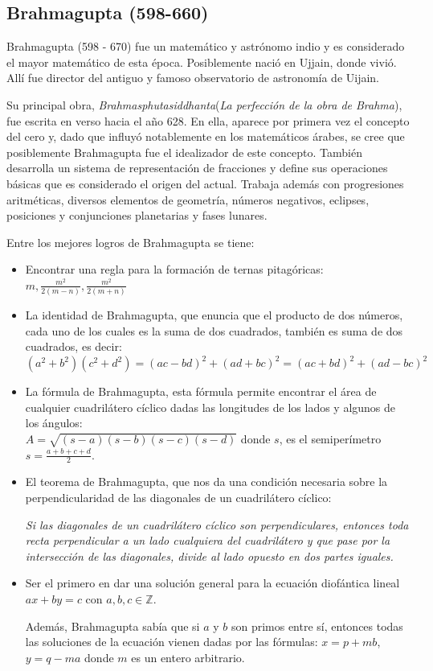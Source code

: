 \documentclass[a4paper, 11pt]{article}
\begin{document}
	\subsection{Brahmagupta (598-660)}
		Brahmagupta (598 - 670) fue un matemático y astrónomo indio y es considerado el mayor matemático de esta época.
		Posiblemente nació en Ujjain, donde vivió. Allí fue director del antiguo y famoso observatorio de astronomía de
		Uijain.
		
		Su principal obra, \textit{Brahmasphutasiddhanta}(\textit{La perfección de la obra de Brahma}), fue escrita en
		verso hacia el año 628. En ella, aparece por primera vez el concepto del cero y, dado que influyó notablemente
		en los matemáticos árabes, se cree que posiblemente Brahmagupta fue el idealizador de este concepto. También
		desarrolla un sistema de representación de fracciones y define sus operaciones básicas que es considerado el
		origen del actual. Trabaja además con progresiones aritméticas, diversos elementos de geometría, números
		negativos, eclipses, posiciones y conjunciones planetarias y fases lunares.

		Entre los mejores logros de Brahmagupta se tiene:
		\begin{itemize}
			\item Encontrar una regla para la formación de ternas pitagóricas: \\
			$\displaystyle m, {\frac{m^{2}}{2(m-n)}}, {\frac{m^{2}}{2(m+n)}}$
			\item La identidad de Brahmagupta, que enuncia que el producto de dos números, cada uno de los cuales es la
			suma de dos cuadrados, también es suma de dos cuadrados, es decir: \\
			$\displaystyle (a^2 + b^2)(c^2 + d^2) =(ac - bd)^2 + (ad + bc)^2 = (ac + bd)^2 + (ad-bc)^2$
			\item La fórmula de Brahmagupta, esta fórmula permite encontrar el área de cualquier cuadrilátero cíclico
			dadas las longitudes de los lados y algunos de los ángulos: \\
			$\displaystyle A = \sqrt{(s - a)(s - b)(s - c)(s - d)}$ donde $s$, es el semiperímetro $\displaystyle s =
			\frac {a + b + c + d}{2}$. 
			\item El teorema de Brahmagupta, que nos da una condición necesaria sobre la perpendicularidad de las
			diagonales de un cuadrilátero cíclico:
			\begin{center}
				\em Si las diagonales de un cuadrilátero cíclico son perpendiculares, entonces toda recta perpendicular
				a un lado cualquiera del cuadrilátero y que pase por la intersección de las diagonales, divide al lado
				opuesto en dos partes iguales.
			\end{center}
			\item Ser el primero en dar una solución general para la ecuación diofántica lineal $ax + by = c$ con $a,b,c
			\in \mathbb {Z}$.
			
			Además, Brahmagupta sabía que si $a$ y $b$ son primos entre sí, entonces todas las soluciones de la ecuación
			vienen dadas por las fórmulas: $x = p + m b$, $y = q - m a$ donde $m$ es un entero arbitrario.
		\end{itemize}
		
\end{document}
